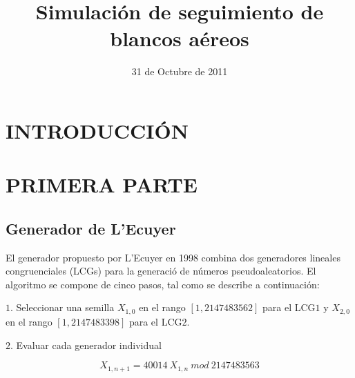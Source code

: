 \documentclass{sig-alternate}
\begin{document}

\title{Simulaci\'on de seguimiento de blancos a\'ereos}


\author{
	\and
}

\date{31 de Octubre de 2011}

\maketitle

\begin{abstract}

\end{abstract}

\begin{keywords}

\end{keywords}

\section{INTRODUCCI\'ON}

\section{PRIMERA PARTE}

\subsection{Generador de L’Ecuyer}
\label{lecuyer}

El generador propuesto por L’Ecuyer en 1998 combina dos generadores lineales congruenciales (LCGs) para la generaci\'o de n\'umeros pseudoaleatorios. El algoritmo se compone de cinco pasos, tal como se describe a continuaci\'on: 
\par
$1$. Seleccionar una semilla $X_{1,0}$ en el rango $[1, 2147483562]$ para el 
LCG$1$ y $X_{2,0}$ en el rango $[1, 2147483398]$ para el LCG$2$.

$2$. Evaluar cada generador individual

\begin{equation}
\label{LCG1}
X_{1,n+1} = 40014 \ X_{1,n} \ mod \ 2147483563
\end{equation}
\end{document}
